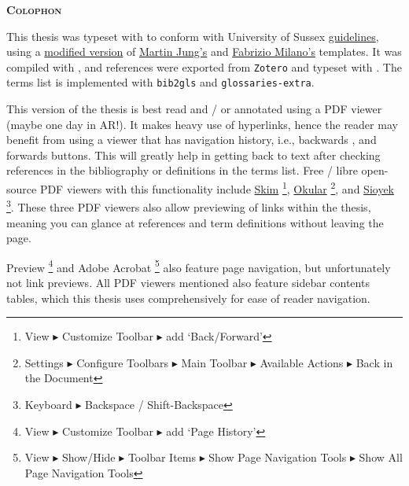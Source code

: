 {}

{}\label{sec: reading}
 \begin{flushleft}
	\Huge \textsc{\textbf{Colophon}}
	
\end{flushleft}
\begin{SingleSpace}
\noindent This thesis was typeset with  to conform with University of Sussex \href{https://www.sussex.ac.uk/rsao/examination}{guidelines}, using a \href{https://github.com/sambilbow/Sussex_PhDThesis}{modified version} of \href{https://github.com/Martin-Jung/Sussex_PhDThesis}{Martin Jung's} and \href{https://github.com/fabriziomiano/phd_thesis}{Fabrizio Milano's} templates. It was compiled with , and references were exported from \verb|Zotero| and typeset with . The terms list is implemented with \verb|bib2gls| and \verb|glossaries-extra|.

\noindent This version of the thesis is best read and / or annotated using a PDF viewer (maybe one day in AR!). It makes heavy use of hyperlinks, hence the reader may benefit from using a viewer that has navigation history, i.e., backwards \faArrowCircleLeft\space, and forwards \faArrowCircleRight\space buttons. This will greatly help in getting back to text after checking references in the bibliography or definitions in the terms list. Free / libre open-source PDF viewers with this functionality include \href{https://sourceforge.net/projects/skim-app/}{Skim} \faApple\space \footnote{View $\blacktriangleright$ Customize Toolbar $\blacktriangleright$ add `Back/Forward'}, \href{https://okular.kde.org/en-gb/}{Okular} \faLinux \space \faWindows \space \footnote{Settings $\blacktriangleright$ Configure Toolbars  $\blacktriangleright$ Main Toolbar $\blacktriangleright$ Available Actions $\blacktriangleright$ Back in the Document}, and \href{https://sioyek.info/}{Sioyek} \faApple \space \faLinux \space \faWindows \space \footnote{Keyboard $\blacktriangleright$ Backspace / Shift-Backspace}. These three PDF viewers also allow previewing of links within the thesis, meaning you can glance at references and term definitions without leaving the page.

\noindent Preview \faApple\space \footnote{View $\blacktriangleright$ Customize Toolbar $\blacktriangleright$ add `Page History'} and Adobe Acrobat \faApple\space \faLinux \space \faWindows \space \footnote{View $\blacktriangleright$  Show/Hide $\blacktriangleright$ Toolbar Items $\blacktriangleright$ Show Page Navigation Tools $\blacktriangleright$ Show All Page Navigation Tools} also feature page navigation, but unfortunately not link previews. All PDF viewers mentioned also feature sidebar contents tables, which this thesis uses comprehensively for ease of reader navigation.


\end{SingleSpace}
